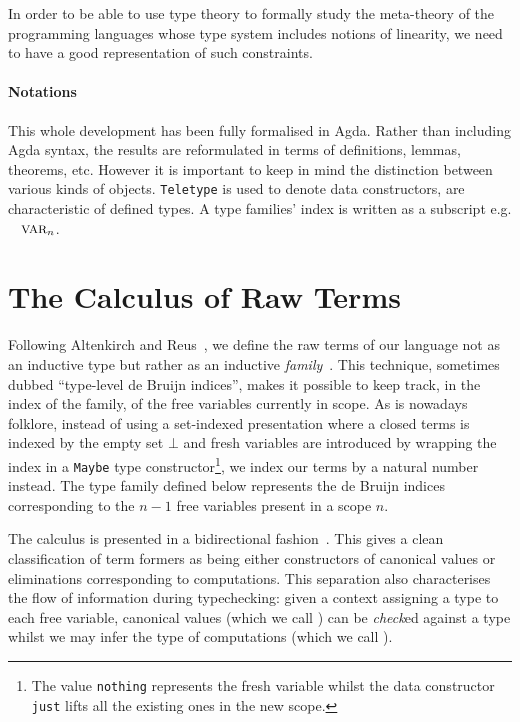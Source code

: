 \documentclass[a4paper,UKenglish]{lipics-v2016}
\begin{document}
In order to be able to use type theory to formally study the meta-theory
of the programming languages whose type system includes notions of linearity,
we need to have a good representation of such constraints.

\paragraph*{Notations} This whole development has been fully formalised
in Agda. Rather than including Agda syntax, the results are reformulated
in terms of definitions, lemmas, theorems, etc. However it is important
to keep in mind the distinction between various kinds of objects.
\texttt{Teletype} is used to denote data constructors,  are characteristic of defined types. A type families' index is
written as a subscript e.g. $\Var{}_n$.

\section{The Calculus of Raw Terms}

Following Altenkirch and Reus~\cite{altenkirch1999monadic},
we define the raw terms of our language not as an inductive
type but rather as an inductive \emph{family}~\cite{dybjer1994inductive}.
This technique, sometimes dubbed ``type-level de Bruijn indices'',
makes it possible to keep track, in the index of the family, of the
free variables currently in scope. As is nowadays folklore, instead of
using a set-indexed presentation where a closed terms is indexed by
the empty set $⊥$ and fresh variables are introduced by wrapping
the index in a \texttt{Maybe} type constructor\footnote{The value
\texttt{nothing} represents the fresh variable whilst the data
constructor \texttt{just} lifts all the existing ones in the new
scope.}, we index our terms by a natural number instead. The
\Var{} type family defined below represents the de Bruijn
indices~\cite{debruijn1972lambda} corresponding to the $n-1$ free
variables present in a scope $n$.


The calculus is presented in a bidirectional fashion~\cite{pierce2000local}.
This gives a clean classification of term formers as being either
constructors of canonical values or eliminations corresponding to
computations. This separation also characterises the flow of
information during typechecking: given a context assigning a type
to each free variable, canonical values (which we call \Checkable{})
can be \emph{check}ed against a type whilst we may infer the type of
computations (which we call \Inferable{}).
\end{document}
